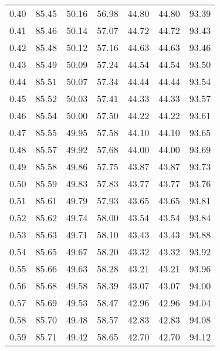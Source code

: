 \begin{tabular}{|c|c|c|c|c|c|c|}
      0.40 &     85.45 &     50.16 &      56.98 &   44.80 &      44.80 &         93.39 \\
      0.41 &     85.46 &     50.14 &      57.07 &   44.72 &      44.72 &         93.43 \\
      0.42 &     85.48 &     50.12 &      57.16 &   44.63 &      44.63 &         93.46 \\
      0.43 &     85.49 &     50.09 &      57.24 &   44.54 &      44.54 &         93.50 \\
      0.44 &     85.51 &     50.07 &      57.34 &   44.44 &      44.44 &         93.54 \\
      0.45 &     85.52 &     50.03 &      57.41 &   44.33 &      44.33 &         93.57 \\
      0.46 &     85.54 &     50.00 &      57.50 &   44.22 &      44.22 &         93.61 \\
      0.47 &     85.55 &     49.95 &      57.58 &   44.10 &      44.10 &         93.65 \\
      0.48 &     85.57 &     49.92 &      57.68 &   44.00 &      44.00 &         93.69 \\
      0.49 &     85.58 &     49.86 &      57.75 &   43.87 &      43.87 &         93.73 \\
      0.50 &     85.59 &     49.83 &      57.83 &   43.77 &      43.77 &         93.76 \\
      0.51 &     85.61 &     49.79 &      57.93 &   43.65 &      43.65 &         93.81 \\
      0.52 &     85.62 &     49.74 &      58.00 &   43.54 &      43.54 &         93.84 \\
      0.53 &     85.63 &     49.71 &      58.10 &   43.43 &      43.43 &         93.88 \\
      0.54 &     85.65 &     49.67 &      58.20 &   43.32 &      43.32 &         93.92 \\
      0.55 &     85.66 &     49.63 &      58.28 &   43.21 &      43.21 &         93.96 \\
      0.56 &     85.68 &     49.58 &      58.39 &   43.07 &      43.07 &         94.00 \\
      0.57 &     85.69 &     49.53 &      58.47 &   42.96 &      42.96 &         94.04 \\
      0.58 &     85.70 &     49.48 &      58.57 &   42.83 &      42.83 &         94.08 \\
      0.59 &     85.71 &     49.42 &      58.65 &   42.70 &      42.70 &         94.12 \\

\end{tabular}
